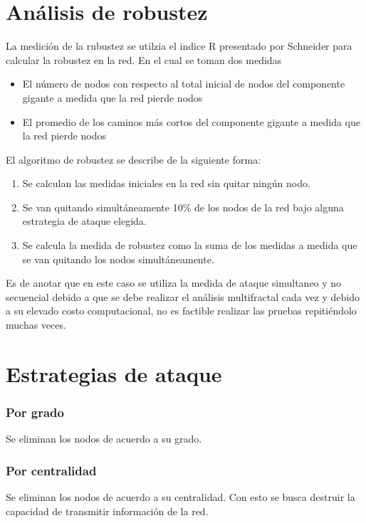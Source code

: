 \section{Análisis de robustez}

La medición de la rubustez se utilzia el indice R presentado por Schneider\cite{Schneider2011} para calcular la robustez en la red. En el cual se toman dos medidas

\begin{itemize}
    \item El número de nodos con respecto al total inicial de nodos del componente gigante a medida que la red pierde nodos
    \item El promedio de los caminos más cortos del componente gigante a medida que la red pierde nodos
\end{itemize}

El algoritmo de robustez se describe de la siguiente forma:

\begin{enumerate}
    \item Se calculan las medidas iniciales en la red sin quitar ningún nodo.
    \item Se van quitando simultáneamente 10\% de los nodos de la red bajo alguna estrategia de ataque elegida.
    \item Se calcula la medida de robustez como la suma de los medidas a medida que se van quitando los nodos simultáneamente.
\end{enumerate}

Es de anotar que en este caso se utiliza la medida de ataque simultaneo y no secuencial debido a que se debe realizar el análisis multifractal cada vez y debido a su elevado costo computacional, no es factible realizar las pruebas repitiéndolo muchas veces.

\section{Estrategias de ataque}


\subsubsection{Por grado}

Se eliminan los nodos de acuerdo a su grado.

\subsubsection{Por centralidad}

Se eliminan los nodos de acuerdo a su centralidad. Con esto se busca destruir la capacidad de transmitir información de la red.